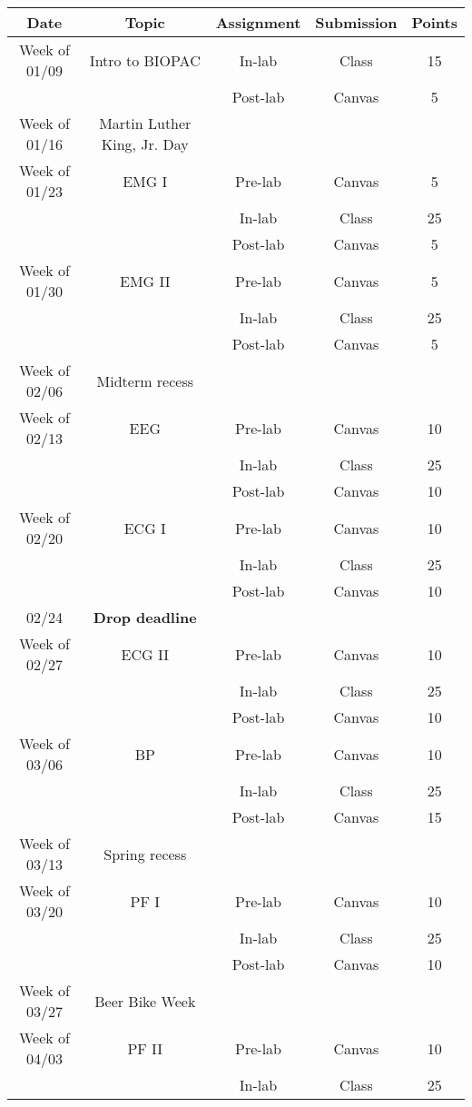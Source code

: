 \documentclass{article}
\begin{document}
\begin{table}[h!]
	\centering
\begin{tabular}[h!]{ccccc}
\toprule
	Date & Topic & Assignment & Submission & Points\\
	\midrule
	Week of 01/09 & Intro to BIOPAC & In-lab & Class & 15\\
		& & Post-lab & Canvas & 5\\
	\midrule
	Week of 01/16 & Martin Luther King, Jr. Day & &\\
	\midrule
	Week of 01/23 & EMG I & Pre-lab & Canvas & 5\\
		& & In-lab & Class & 25\\
		& & Post-lab & Canvas & 5\\
	Week of 01/30 & EMG II & Pre-lab & Canvas & 5\\
	 	& & In-lab & Class & 25\\
	 	& & Post-lab & Canvas & 5\\
	\midrule
	Week of 02/06 & Midterm recess & &\\
	\midrule
	Week of 02/13 & EEG & Pre-lab & Canvas & 10\\
	 	& & In-lab & Class & 25\\
	 	& & Post-lab & Canvas & 10\\
	Week of 02/20 & ECG I & Pre-lab & Canvas & 10\\
		& & In-lab & Class & 25\\
		& & Post-lab & Canvas & 10\\
	\midrule
	02/24 & \textbf{Drop deadline} & &\\
	\midrule
	Week of 02/27 & ECG II & Pre-lab & Canvas & 10\\
		& & In-lab & Class & 25\\
		& & Post-lab & Canvas & 10\\
	Week of 03/06 & BP & Pre-lab & Canvas & 10\\
		& & In-lab & Class & 25\\
		& & Post-lab & Canvas & 15\\
	\midrule
	Week of 03/13 & Spring recess & &\\
	\midrule
	Week of 03/20 & PF I & Pre-lab & Canvas & 10\\
		& & In-lab & Class & 25\\
		& & Post-lab & Canvas & 10\\
	\midrule
	Week of 03/27 & Beer Bike Week & & \\
	\midrule
	Week of 04/03 & PF II & Pre-lab & Canvas & 10\\
		& & In-lab & Class & 25\\

\end{tabular}
\end{table}
\end{document}
